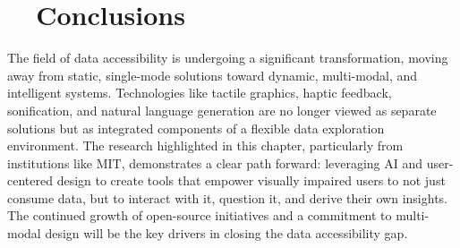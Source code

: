\section{~~Conclusions}\label{ch13:sec:conclusions}
The field of data accessibility is undergoing a significant transformation, moving away from static, single-mode solutions toward dynamic, multi-modal, and intelligent systems. Technologies like tactile graphics, haptic feedback, sonification, and natural language generation are no longer viewed as separate solutions but as integrated components of a flexible data exploration environment. The research highlighted in this chapter, particularly from institutions like MIT, demonstrates a clear path forward: leveraging AI and user-centered design to create tools that empower visually impaired users to not just consume data, but to interact with it, question it, and derive their own insights. The continued growth of open-source initiatives and a commitment to multi-modal design will be the key drivers in closing the data accessibility gap.
